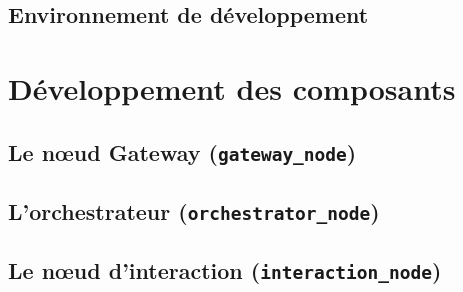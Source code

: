 \documentclass[11pt]{article}
\begin{document}
\subsection{Environnement de développement}

\newpage

\section{Développement des composants}

\subsection{Le nœud Gateway (\texttt{gateway\_node})}

\subsection{L'orchestrateur (\texttt{orchestrator\_node})}

\subsection{Le nœud d'interaction (\texttt{interaction\_node})}
\end{document}
